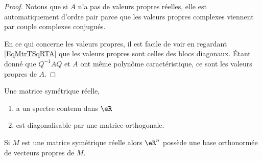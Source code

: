 \begin{proof}
    Notons que si \( A\) n'a pas de valeurs propres réelles, elle est automatiquement d'ordre pair parce que les valeurs propres complexes viennent par couple complexes conjugués.

    En ce qui concerne les valeurs propres, il est facile de voir en regardant \eqref{EqMtrTSqRTA} que les valeurs propres sont celles des blocs diagonaux. Étant donné que \( Q^{-1}AQ\) et \( A\) ont même polynôme caractéristique, ce sont les valeurs propres de \( A\).
\end{proof}

\begin{theorem} \label{ThoeTMXla}
    Une matrice symétrique réelle,
    \begin{enumerate}
        \item       \label{ITEMooJWHLooSfhNSW}
            a un spectre contenu dans \( \eR\)
        \item       \label{ITEMooMWWRooXxGONW}
            est diagonalisable par une matrice orthogonale.
    \end{enumerate}
    Si \( M\) est une matrice symétrique réelle alors \( \eR^n\) possède une base orthonormée de vecteurs propres de \( M\).
\end{theorem}

